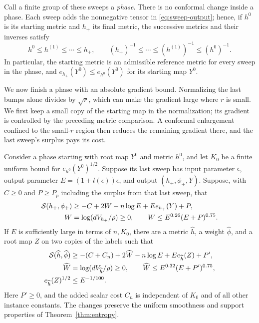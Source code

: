 Call a finite group of these sweeps a \emph{phase}.  There is no
conformal change inside a phase.  Each sweep adds the nonnegative
tensor in \eqref{eq:sweep-output}; hence, if \(h^0\) is its starting
metric and \(h_+\) its final metric, the successive metrics and their
inverses satisfy
\[
 h^0\leq h^{(1)}\leq\cdots\leq h_+,\qquad
 (h_+)^{-1}\leq\cdots\leq(h^{(1)})^{-1}\leq(h^0)^{-1}.
\]
In particular, the starting metric is an admissible reference metric
for every sweep in the phase, and
\(e_{h_+}(Y^0)\leq e_{h^0}(Y^0)\) for its starting map \(Y^0\).

We now finish a phase with an absolute gradient bound.  Normalizing
the last bumps alone divides by \(\sqrt r\), which can make the
gradient large where \(r\) is small.  We first keep a small copy of
the starting map in the normalization; its gradient is controlled by
the preceding metric comparison.  A conformal enlargement confined
to the small-\(r\) region then reduces the remaining gradient there,
and the last sweep's surplus pays its cost.

\begin{lemma}\label{lem:entropy-phase-exit}
Consider a phase starting with root map \(Y^0\) and metric \(h^0\), and
let \(K_0\) be a finite uniform bound for \(e_{h^0}(Y^0)^{1/2}\).
Suppose its last sweep has input parameter \(\epsilon\), output
parameter \(E=(1+l(\epsilon))\epsilon\), and output
\((h_+,\phi_+,Y)\).  Suppose, with \(C\geq0\) and \(P\geq P_p\) including the
surplus from that last sweep, that
\begin{equation}\label{eq:entropy-before-exit}
\begin{split}
 \mathcal S(h_+,\phi_+)&\geq-C+2W-n\log E+E e_{h_+}(Y)+P,\\
 W&=\log(dV_{h_+}/\rho)\geq0,\qquad
 W\leq E^{0.26}(E+P)^{0.75}.
\end{split}
\end{equation}
If \(E\) is sufficiently large in terms of \(n,K_0\), there are a
metric \(\widehat h\), a weight \(\widehat\phi\), and a root map \(Z\)
on two copies of the labels such that
\begin{equation}\label{eq:entropy-after-exit}
\begin{split}
 \mathcal S(\widehat h,\widehat\phi)
 &\geq-(C+C_n)+2\widehat W-n\log E
                      +E e_{\widehat h}(Z)+P',\\
 \widehat W&=\log(dV_{\widehat h}/\rho)\geq0,\qquad
 \widehat W\leq E^{0.32}(E+P')^{0.75},\\
 e_{\widehat h}(Z)^{1/2}&\leq E^{-1/100}.
\end{split}
\end{equation}
Here \(P'\geq0\), and the added scalar cost \(C_n\) is independent
of \(K_0\) and of all other instance constants.  The changes preserve
the uniform smoothness and support properties of
Theorem~\ref{thm:entropy}.
\end{lemma}

